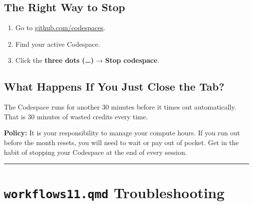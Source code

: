 \documentclass[
  letterpaper,
  DIV=11,
  numbers=noendperiod,
  oneside]{scrreprt}
\providecommand{\tightlist}{%
  \setlength{\itemsep}{0pt}\setlength{\parskip}{0pt}}
\begin{document}
\subsection*{The Right Way to Stop}\label{the-right-way-to-stop}

\begin{enumerate}
\def\labelenumi{\arabic{enumi}.}
\tightlist
\item
  Go to \href{https://github.com/codespaces}{github.com/codespaces}.
\item
  Find your active Codespace.
\item
  Click the \textbf{three dots (\ldots)} → \textbf{Stop codespace}.
\end{enumerate}

\subsection*{What Happens If You Just Close the
Tab?}\label{what-happens-if-you-just-close-the-tab}

The Codespace runs for another 30 minutes before it times out
automatically. That is 30 minutes of wasted credits every time.

\begin{tcolorbox}[enhanced jigsaw, opacitybacktitle=0.6, colbacktitle=quarto-callout-warning-color!10!white, breakable, opacityback=0, coltitle=black, toptitle=1mm, bottomrule=.15mm, colframe=quarto-callout-warning-color-frame, bottomtitle=1mm, colback=white, leftrule=.75mm, rightrule=.15mm, title=\textcolor{quarto-callout-warning-color}{\faExclamationTriangle}\hspace{0.5em}{Warning}, left=2mm, arc=.35mm, toprule=.15mm, titlerule=0mm]

\textbf{Policy:} It is your responsibility to manage your compute hours.
If you run out before the month resets, you will need to wait or pay out
of pocket. Get in the habit of stopping your Codespace at the end of
every session.

\end{tcolorbox}

\begin{center}\rule{0.5\linewidth}{0.5pt}\end{center}

\section*{\texorpdfstring{\texttt{workflows11.qmd}
Troubleshooting}{workflows11.qmd Troubleshooting}}\label{workflows11.qmd-troubleshooting}
\end{document}
